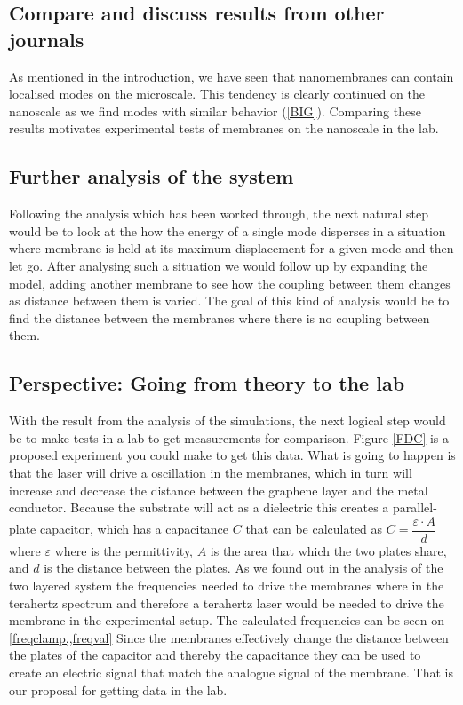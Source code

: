 \subsection{Compare and discuss results from other journals}
As mentioned in the introduction, we have seen that nanomembranes can contain localised modes on the microscale\cite[Fig 3]{Davidovikj2016}. This tendency is clearly continued on the nanoscale as we find modes with similar behavior (\cref{BIG}). Comparing these results motivates experimental tests of membranes on the nanoscale in the lab.

\subsection{Further analysis of the system}
Following the analysis which has been worked through, the next natural step would be to look at the how the energy of a single mode disperses in a situation where membrane is held at its maximum displacement for a given mode and then let go. After analysing such a situation we would follow up by expanding the model, adding another membrane to see how the coupling between them changes as distance between them is varied. The goal of this kind of analysis would be to find the distance between the membranes where there is no coupling between them.

\subsection{Perspective: Going from theory to the lab}
With the result from the analysis of the simulations, the next logical step would be to make tests in a lab to get measurements for comparison. Figure \ref{FDC} is a proposed experiment you could make to get this data. What is going to happen is that the laser will drive a oscillation in the membranes, which in turn will increase and decrease the distance between the graphene layer and the metal conductor. Because the substrate will act as a dielectric this creates a parallel-plate capacitor, which has a capacitance $C$ that can be calculated as $C=\dfrac{\varepsilon\cdot A}{d}$ where $\varepsilon$ where is the permittivity, $A$ is the area that which the two plates share, and $d$ is the distance between the plates. As we found out in the analysis of the two layered system the frequencies needed to drive the membranes where in the terahertz spectrum and therefore a terahertz laser would be needed to drive the membrane in the experimental setup. The calculated frequencies can be seen on \cref{freqclamp,,freqval} Since the membranes effectively change the distance between the plates of the capacitor and thereby the capacitance they can be used to create an electric signal that match the analogue signal of the membrane. That is our proposal for getting data in the lab.

